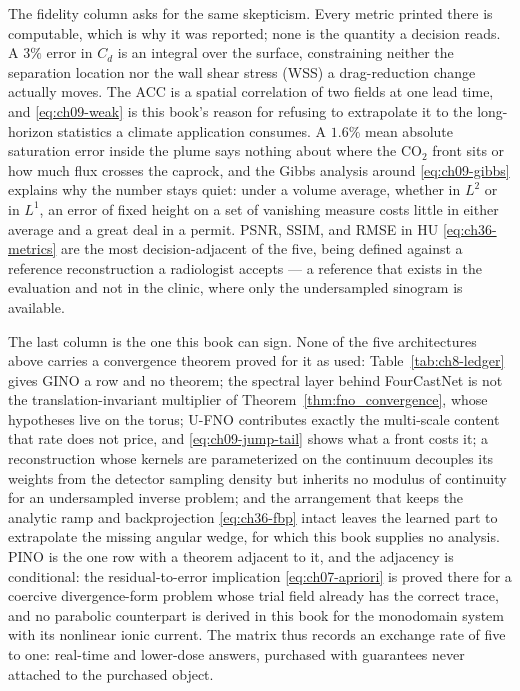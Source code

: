 The fidelity column asks for the same skepticism. Every metric printed
there is computable, which is why it was reported; none is the quantity a decision reads. A
$3\%$ error in $C_d$ is an integral over the surface, constraining neither the separation
location nor the wall shear stress (WSS) a drag-reduction change actually moves. The ACC is a
spatial correlation of two fields at one lead time, and \eqref{eq:ch09-weak} is this book's
reason for refusing to extrapolate it to the long-horizon statistics a climate application
consumes. A $1.6\%$ mean absolute saturation error inside the plume says nothing about where the
$\mathrm{CO}_2$ front sits or how much flux crosses the caprock, and the Gibbs analysis
around \eqref{eq:ch09-gibbs} explains why the number stays quiet: under a volume
average, whether in $L^2$ or in $L^1$, an error of fixed height on
a set of vanishing measure costs little in either average and a great deal in a permit. PSNR, SSIM,
and RMSE in HU \eqref{eq:ch36-metrics} are the most decision-adjacent of the five, being defined against a reference
reconstruction a radiologist accepts --- a reference that exists in the evaluation and not in
the clinic, where only the undersampled sinogram is
available.

The last column is the one this book can sign. None of the five architectures above
carries a convergence theorem proved for it as used: Table~\ref{tab:ch8-ledger} gives GINO a
row and no theorem; the spectral layer behind FourCastNet is not the
translation-invariant multiplier of Theorem~\ref{thm:fno_convergence}, whose hypotheses live
on the torus; U-FNO contributes exactly the multi-scale content that rate does not price, and
\eqref{eq:ch09-jump-tail} shows what a front costs it; a reconstruction whose kernels are
parameterized on the continuum decouples its weights from the detector sampling density but
inherits no modulus of continuity for an undersampled inverse problem; and the arrangement
that keeps the analytic ramp and backprojection \eqref{eq:ch36-fbp} intact leaves the learned
part to extrapolate the missing angular wedge, for which this book supplies no
analysis.
PINO is the one row with a theorem adjacent to it, and the adjacency is conditional: the
residual-to-error implication \eqref{eq:ch07-apriori} is proved there for a coercive
divergence-form problem whose trial field already has the correct trace, and no parabolic
counterpart is derived in this book for the monodomain system with its nonlinear ionic
current. The matrix thus records an exchange rate of five to one: real-time and lower-dose
answers, purchased with guarantees never attached to the purchased object.

